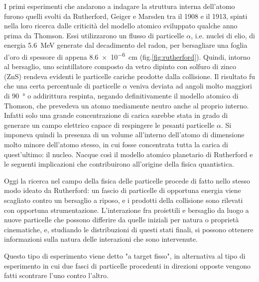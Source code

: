 \documentclass[../main.tex]{subfiles}
\begin{document}
I primi esperimenti che andarono a indagare la struttura interna dell'atomo furono quelli svolti da Rutherford, Geiger e Marsden tra il 1908 e il 1913, spinti nella loro ricerca dalle criticità del modello atomico sviluppato qualche anno prima da Thomson. Essi utilizzarono un flusso di particelle $\alpha$, i.e. nuclei di elio, di energia \SI{5.6}{\MeV} generate dal decadimento del radon, per bersagliare una foglia d'oro di spessore di appena \SI{8.6e-6}{\cm} (fig.\ref{fig:rutherford}). Quindi, intorno al bersaglio, uno scintillatore composto da vetro dipinto con solfuro di zinco (ZnS) rendeva evidenti le particelle cariche prodotte dalla collisione. Il risultato fu che una certa percentuale di particelle $\alpha$ veniva deviata ad angoli molto maggiori di \SI{90}{°} o addirittura respinta, negando definitivamente il modello atomico di Thomson, che prevedeva un atomo mediamente neutro anche al proprio interno. Infatti solo una grande concentrazione di carica sarebbe stata in grado di generare un campo elettrico capace di respingere le pesanti particelle $\alpha$. Si imponeva quindi la presenza di un volume all'interno dell'atomo di dimensione molto minore dell'atomo stesso, in cui fosse concentrata tutta la carica di quest'ultimo: il nucleo. Nacque così il modello atomico planetario di Rutherford e le seguenti implicazioni che contribuirono all'origine della fisica quantistica. 

Oggi la ricerca nel campo della fisica delle particelle procede di fatto nello stesso modo ideato da Rutherford: un fascio di particelle di opportuna energia viene scagliato contro un bersaglio a riposo, e i prodotti della collisione sono rilevati con opportuna strumentazione. L'interazione fra proiettili e bersaglio da luogo a nuove particelle che possono differire da quelle iniziali per natura o proprietà cinematiche, e, studiando le distribuzioni di questi stati finali, si possono ottenere informazioni sulla natura delle interazioni che sono intervenute.

Questo tipo di esperimento viene detto "a target fisso", in alternativa al tipo di esperimento in cui due fasci di particelle procedenti in direzioni opposte vengono fatti scontrare l'uno contro l'altro.
\end{document}
